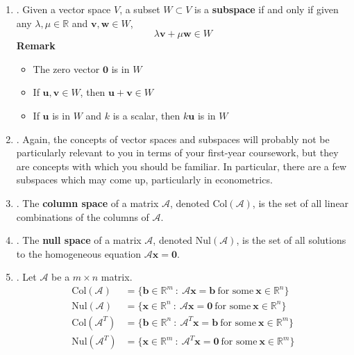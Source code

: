 \documentclass[12pt]{article}
\begin{document}
\begin{enumerate}
\begin{enumerate}
	\item\underline{}.
		Given a vector space $V$, a subset $W \subset V$ is a \textbf{subspace} if and only if given any $\lambda, \mu \in \mathbb{R}$ and $\mathbf{v}, \mathbf{w} \in W$, \[ \lambda \mathbf{v} + \mu \mathbf{w} \in W \]
		\textbf{Remark} 
		\begin{itemize}
			\item The zero vector $\mathbf{0}$ is in $W$
			\item If $\mathbf{u},\mathbf{v}\in W$, then $\mathbf{u}+\mathbf{v}\in W$
			\item If $\mathbf{u}$ is in $W$ and $k$ is a scalar, then $k\mathbf{u}$ is in $W$
		\end{itemize}

	\item\underline{}.
		Again, the concepts of vector spaces and subspaces will probably not be particularly relevant to you in terms of your first-year
		coursework, but they are concepts with which you should be familiar. In particular, there are a few subspaces which may come up,
		particularly in econometrics.

	\item\underline{}.
		The \textbf{column space} of a matrix $\mathcal{A}$, denoted $\text{Col}(\mathcal{A})$, is the set of all linear combinations of the columns of $\mathcal{A}$.

	\item\underline{}.
		The \textbf{null space} of a matrix $\mathcal{A}$, denoted $\text{Nul}(\mathcal{A})$, is the set of all solutions to the homogeneous equation
		$\mathcal{A}\mathbf{x}=\mathbf{0}$.
		
	\item\underline{}.
		Let $\mathcal{A}$ be a $m \times n$ matrix. 
		\begin{align*} 
			\text{Col}(\mathcal{A}) &= \{ \mathbf{b} \in \mathbb{R}^m \ : \  \mathcal{A} \mathbf{x} = \mathbf{b} \ \text{for some} \ \mathbf{x} \in \mathbb{R}^n \} \\
			\text{Nul}(\mathcal{A}) &= \{ \mathbf{x} \in \mathbb{R}^n \ : \ \mathcal{A} \mathbf{x}= \mathbf{0} \ \text{for some} \ \mathbf{x} \in \mathbb{R}^n \} \\
			\text{Col}(\mathcal{A}^T) &= \{ \mathbf{b} \in \mathbb{R}^n \ : \  \mathcal{A}^T \mathbf{x} = \mathbf{b} \ \text{for some} \ \mathbf{x} \in \mathbb{R}^m \} \\
			\text{Nul}(\mathcal{A}^T) &= \{ \mathbf{x} \in \mathbb{R}^m \ : \ \mathcal{A}^T \mathbf{x}= \mathbf{0} \ \text{for some} \ \mathbf{x} \in \mathbb{R}^m \} \\
		\end{align*}


\end{enumerate}
\end{enumerate}
\end{document}
